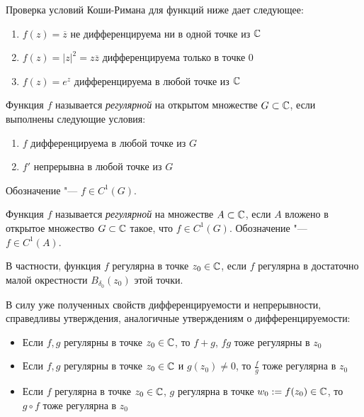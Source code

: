 \begin{example}
	Проверка условий Коши-Римана для функций ниже дает следующее:
	\begin{enumerate}
		\item $f(z) =\overline{z}$ не дифференцируема ни в одной точке из $\mathbb{C}$
		\item $f(z) = |z|^2 = z\overline{z}$ дифференцируема только в точке $0$
		\item $f(z) = e^z$ дифференцируема в любой точке из $\mathbb{C}$
	\end{enumerate}
\end{example}

\begin{definition}
	Функция $f$ называется \textit{регулярной} на открытом множестве $G \subset \mathbb{C}$, если выполнены следующие условия:
	\begin{enumerate}
		\item $f$ дифференцируема в любой точке из $G$
		\item $f'$ непрерывна в любой точке из $G$
	\end{enumerate}

	Обозначение "--- $f \in C^1(G)$.
\end{definition}

\begin{definition}
	Функция $f$ называется \textit{регулярной} на множестве $A \subset \mathbb{C}$, если $A$ вложено в открытое множество $G \subset \mathbb{C}$ такое, что $f \in C^1(G)$. Обозначение "--- $f \in C^1(A)$.
\end{definition}

\begin{note}
	В частности, функция $f$ регулярна в точке $z_0 \in \mathbb{C}$, если $f$ регулярна в достаточно малой окрестности $B_{\delta_0}(z_0)$ этой точки.
\end{note}

\begin{note}
	В силу уже полученных свойств дифференцируемости и непрерывности, справедливы утверждения, аналогичные утверждениям о дифференцируемости:
	\begin{itemize}
		\item Если $f, g$ регулярны в точке $z_0 \in \mathbb{C}$, то $f + g$, $fg$ тоже регулярны в $z_0$
		\item Если $f, g$ регулярны в точке $z_0 \in \mathbb{C}$ и $g(z_0) \ne 0$, то $\frac fg$ тоже регулярна в $z_0$
		\item Если $f$ регулярна в точке $z_0 \in \mathbb{C}$, $g$ регулярна в точке $w_0 := f(z_0) \in \mathbb{C}$, то $g \circ f$ тоже регулярна в $z_0$
	\end{itemize}
\end{note}

